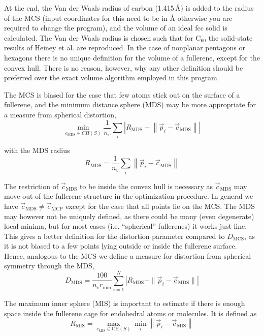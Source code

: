 \documentclass[article,a4paper,twoside]{memoir}
\newcommand{\C}[1]{\ensuremath{\mathrm{C}_{#1}}}
\begin{document}
At the end, the Van der Waals radius of carbon (1.415\,\AA) is added to the radius of the MCS
(input coordinates for this need to be in \AA{} otherwise you are required to change the program),
and the volume of an ideal fcc solid is calculated. The Van der Waals radius is chosen such that
for \C{60} the solid-state results of Heiney et al. \cite{Heiney91} are reproduced.
In the case of nonplanar pentagons or hexagons there is no unique definition for the volume of a fullerene,
except for the convex hull. There is no reason, however, why any other definition should be preferred
over the exact volume algorithm employed in this program.

The MCS is biased for the case that few atoms stick out on the surface of a fullerene,
and the minimum distance sphere (MDS) may be more appropriate for a measure from spherical distortion,
\begin{equation} 
\min\limits_{c_\mathrm{MDS} \in CH(S)} \frac{1}{n_v} \sum _{i} \left|R_\mathrm{MDS} -\left\| \vec{p}_{i}-\vec{c}_\mathrm{MDS} \right\| \right|  
\end{equation}

with the MDS radius
\begin{equation} 
	R_{\mathrm{MDS}} =\frac{1}{n_v} \sum _{i}\left\| \vec{p}_{i} -\vec{c}_{\mathrm{MDS}} \right\|   
	\label{eq:RMDS}
\end{equation} 

The restriction of $\vec{c}_{\mathrm{MDS}}$ to be inside the convex hull is necessary as $\vec{c}_{\mathrm{MDS}}$ may move
out of the fullerene structure in the optimization procedure.  In general we have $\vec{c}_{\mathrm{MDS}}\ne\vec{c}_{\mathrm{MCP}}$
except for the case that all points lie on the MCS. The MDS may however not be uniquely defined, as there could be many 
(even degenerate) local minima, but for most cases (i.e. ``spherical'' fullerenes) it works just fine.  
This gives a better definition for the distortion
parameter compared to $D_{\mathrm{MCS}}$, as it is not biased to a few points lying outside or inside the fullerene surface.
Hence, analogous to the MCS we define a measure for distortion from spherical symmetry through the MDS,
\begin{equation}
  \label{eq:DMDS}
  D_{\mathrm{MDS}} = \frac{100}{n_v r_{\mathrm{min}}} \sum_{i=1}^N \left|R_{\mathrm{MDS}} - \|\vec{p}_i - \vec{c}_{\mathrm{MDS}}\| \right|
\end{equation}

The maximum inner sphere (MIS) is important to estimate if there is enough space inside the fullerene cage for endohedral atoms or molecules. It is
defined as
\begin{equation}
	R_{\mathrm{MIS}} = \max\limits_{c_{\mathrm{MIS}} \in \mathrm{CH}(S)} \min\limits_{i} \left\| \vec{p}_{i} -\vec{c}_{\mathrm{MIS}} \right\|  
	\label{MES} 
\end{equation}
\end{document}

